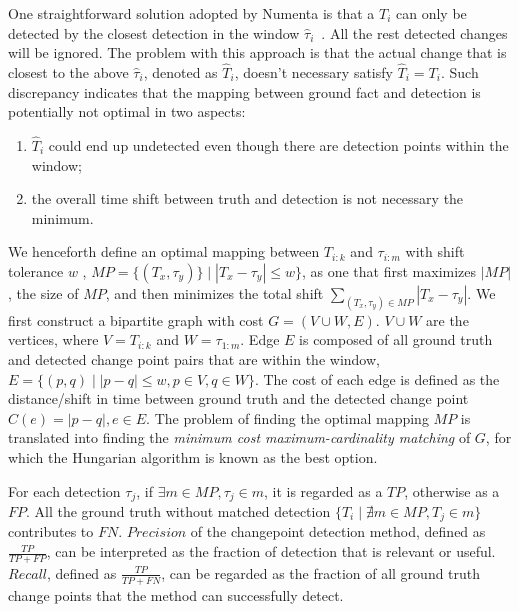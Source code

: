 One straightforward solution adopted by Numenta is that a $T_i$ can only be detected
by the closest detection in the window $\hat \tau_i$~\cite{Lavin2016}. All the rest detected changes will be ignored.
The problem with this approach is that the actual change that is closest to the above $\hat \tau_i$, denoted as $\hat T_i$, doesn't necessary satisfy $\hat T_i = T_i$. 
Such discrepancy indicates that the mapping between ground fact and detection is potentially not optimal in two aspects:
\begin{enumerate}
\item $\hat T_i$ could end up undetected even though there are detection points within the window;
\item the overall time shift between truth and detection is not necessary the minimum.
\end{enumerate}

We henceforth define an optimal mapping between $T_{i:k}$ and $\tau_{i:m}$ with shift tolerance $w$ , $MP = \{(T_x, \tau_y)\} \mid |T_x - \tau_y| \leq w \}$, as one that first maximizes $|MP|$, the size of $MP$, and then minimizes the total shift $\sum_{(T_x, \tau_y) \in MP} |T_x - \tau_y|$. 
We first construct a bipartite graph with cost $G = (V \cup W, E)$.
$V \cup W$ are the vertices, where $V = T_{i:k}$ and $W = \tau_{1:m}$.
Edge $E$ is composed of all ground truth and detected change point pairs that are within the window, $E = \{(p, q) \mid |p - q| \leq w, p \in V, q \in W \}$.
The cost of each edge is defined as the distance/shift in time between ground truth and the detected change point $C(e) = |p-q|, e \in E$.
The problem of finding the optimal mapping $MP$ is translated into finding the \textit{minimum cost maximum-cardinality matching} of $G$, for which the Hungarian algorithm is known as the best option.

For each detection $\tau_j$, if $\exists m \in MP, \tau_j \in m$, it is regarded as a $TP$, otherwise as a $FP$.
All the ground truth without matched detection $\{T_i \mid \nexists m \in MP, T_j \in m\}$ contributes to $FN$.
$Precision$ of the changepoint detection method, defined as  $\frac{TP}{TP+FP}$, can be interpreted as the fraction of detection that is relevant or useful.
$Recall$, defined as $\frac{TP}{TP+FN}$, can be regarded as the fraction of all ground truth change points that the method can successfully detect.

